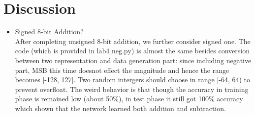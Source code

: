 \documentclass[12pt,a4paper]{article}
\begin{document}
\begin{figure}[hbt]
\centering
{}
\end{figure} 

\section{Discussion} \label{sec:dis}
\begin{itemize}
\item {Signed 8-bit Addition?} \\
After completing unsigned 8-bit addition, we further consider signed one. The code (which is provided in $\text{lab4\_neg.py}$) is almost the same besides conversion between two representation and data generation part: since including negative part, MSB this time doesnot effect the magnitude and hence the range becomes [-128, 127]. Two random intergers should choose in range [-64, 64) to prevent overfloat. The weird behavior is that though the accuracy in training phase is remained low (about 50\%), in test phase it still got 100\% accuracy which shown that the network learned both addition and subtraction. 

\end{itemize}


%
%
\end{document}
